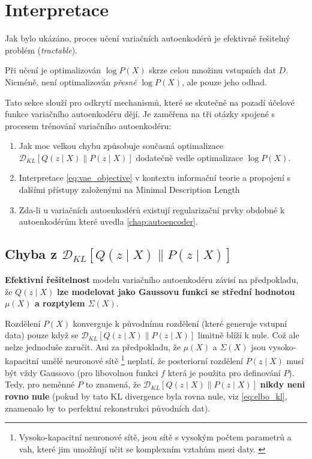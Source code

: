 \section{Interpretace}
Jak bylo ukázáno, proces učení variačních autoenkodérů je efektivně řešitelný problém (\emph{tractable}).

Při učení je optimalizován $\log P(X)$ skrze celou množinu vstupních dat $D$. Nicméně, není optimalizován \emph{přesně} $\log P(X)$, ale pouze jeho odhad.

Tato sekce slouží pro odkrytí mechanismů, které se skutečně na pozadí účelové funkce variačního autoenkodéru dějí.
Je zaměřena na tři otázky spojené s procesem trénování variačního autoenkodéru:
\begin{enumerate}
    \item Jak moc velkou chybu způsobuje současná optimalizace $\mathcal{D}_{KL}\left[ Q(z\mid X) \parallel P(z\mid X) \right]$ dodatečně vedle optimalizace $\log P(X)$.
    \item Interpretace \autoref{eq:vae_objective} v kontextu informační teorie a propojení s dalšími přístupy založenými na Minimal Description Length
    \item Zda-li u variačních autoenkodérů existují regularizační prvky obdobné k autoenkodérům které uvedla \autoref{chap:autoencoder}.
\end{enumerate}

\subsection{Chyba z $\mathcal{D}_{KL}\left[ Q(z\mid X) \parallel P(z\mid X) \right]$}
\textbf{Efektivní řešitelnost} modelu variačního autoenkodéru závisí na předpokladu,
že $Q(z\mid X)$ \textbf{lze modelovat jako Gaussovu funkci se střední hodnotou $\mu(X)$ a rozptylem $\Sigma(X)$}.

Rozdělení $P(X)$ konverguje k původnímu rozdělení (které generuje vstupní data) pouze když se $\mathcal{D}_{KL}\left[ Q(z\mid X) \parallel P(z\mid X) \right]$ limitně blíží k nule.
Což ale nelze jednoduše zaručit. Ani za předpokladu, že $\mu(X)$ a $\Sigma(X)$ jsou vysoko-kapacitní umělé neuronové sítě
\footnote{Vysoko-kapacitní neuronové sítě, jsou sítě s vysokým počtem parametrů a vah, které jim umožňují učit se komplexním vztahům mezi daty. \cite[Kapitola 5]{Goodfellow2016}}
neplatí, že posteriorní rozdělení $P(z\mid X)$ musí být vždy Gaussovo (pro libovolnou funkci $f$ která je použita pro definování $P$).
Tedy, pro neměnné $P$ to znamená, že $\mathcal{D}_{KL}\left[ Q(z\mid X) \parallel P(z\mid X) \right]$ \textbf{nikdy neni rovno nule} (pokud by tato KL divergence byla rovna nule, viz \autoref{eq:elbo_kl}, znamenalo by to perfektní rekonstrukci původních dat).

